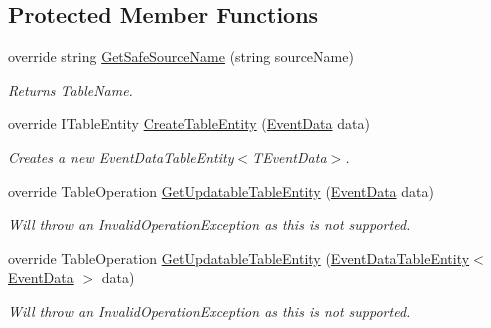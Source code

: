\subsection*{Protected Member Functions}
\begin{DoxyCompactItemize}
\item 
override string \hyperlink{classCqrs_1_1Azure_1_1BlobStorage_1_1Events_1_1TableStorageSnapshotStore_1_1RawTableStorageSnapshotStore_af20c9f26ee29e95c89fb4ba24783472b_af20c9f26ee29e95c89fb4ba24783472b}{Get\+Safe\+Source\+Name} (string source\+Name)
\begin{DoxyCompactList}\small\item\em Returns Table\+Name. \end{DoxyCompactList}\item 
override I\+Table\+Entity \hyperlink{classCqrs_1_1Azure_1_1BlobStorage_1_1Events_1_1TableStorageSnapshotStore_1_1RawTableStorageSnapshotStore_a95ed4acb7d3445b066ed8f8717738715_a95ed4acb7d3445b066ed8f8717738715}{Create\+Table\+Entity} (\hyperlink{classCqrs_1_1Events_1_1EventData}{Event\+Data} data)
\begin{DoxyCompactList}\small\item\em Creates a new Event\+Data\+Table\+Entity$<$\+T\+Event\+Data$>$. \end{DoxyCompactList}\item 
override Table\+Operation \hyperlink{classCqrs_1_1Azure_1_1BlobStorage_1_1Events_1_1TableStorageSnapshotStore_1_1RawTableStorageSnapshotStore_aaa0f7573c822c83550878e25873099a5_aaa0f7573c822c83550878e25873099a5}{Get\+Updatable\+Table\+Entity} (\hyperlink{classCqrs_1_1Events_1_1EventData}{Event\+Data} data)
\begin{DoxyCompactList}\small\item\em Will throw an Invalid\+Operation\+Exception as this is not supported. \end{DoxyCompactList}\item 
override Table\+Operation \hyperlink{classCqrs_1_1Azure_1_1BlobStorage_1_1Events_1_1TableStorageSnapshotStore_1_1RawTableStorageSnapshotStore_ac3ead9ef0bc43493ebcd2f18ef4e2901_ac3ead9ef0bc43493ebcd2f18ef4e2901}{Get\+Updatable\+Table\+Entity} (\hyperlink{classCqrs_1_1Azure_1_1BlobStorage_1_1EventDataTableEntity}{Event\+Data\+Table\+Entity}$<$ \hyperlink{classCqrs_1_1Events_1_1EventData}{Event\+Data} $>$ data)
\begin{DoxyCompactList}\small\item\em Will throw an Invalid\+Operation\+Exception as this is not supported. \end{DoxyCompactList}\end{DoxyCompactItemize}
